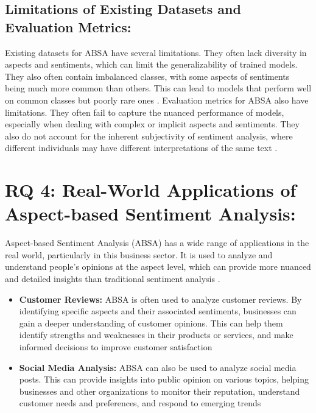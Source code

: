 \documentclass{article}
\begin{document}
\subsection{Limitations of Existing Datasets and Evaluation Metrics: }
Existing datasets for ABSA have several limitations. They often lack diversity in aspects and sentiments, which can limit the generalizability of trained models. They also often contain imbalanced classes, with some aspects of sentiments being much more common than others. This can lead to models that perform well on common classes but poorly rare ones \cite{NazirIssues&Chall2023}.
Evaluation metrics for ABSA also have limitations. They often fail to capture the nuanced performance of models, especially when dealing with complex or implicit aspects and sentiments. They also do not account for the inherent subjectivity of sentiment analysis, where different individuals may have different interpretations of the same text \cite{NazirIssues&Chall2023}\cite{Dhanith2023ACE}.

\section{RQ 4: Real-World Applications of Aspect-based Sentiment Analysis: }
Aspect-based Sentiment Analysis (ABSA) has a wide range of applications in the real world, particularly in this business sector. It is used to analyze and understand people's opinions at the aspect level, which can provide more nuanced and detailed insights than traditional sentiment analysis \cite{hua2023systematic}.
\begin{itemize}
    \item \textbf{Customer Reviews: } ABSA is often used to analyze customer reviews. By identifying specific aspects and their associated sentiments, businesses can gain a deeper understanding of customer opinions. This can help them identify strengths and weaknesses in their products or services, and make informed decisions to improve customer satisfaction \cite{Horsa2023AspectBasedSA}
    \item \textbf{Social Media Analysis: } ABSA can also be used to analyze social media posts. This can provide insights into public opinion on various topics, helping businesses and other organizations to monitor their reputation, understand customer needs and preferences, and respond to emerging trends\cite{hua2023systematic}
\end{itemize}
\end{document}
